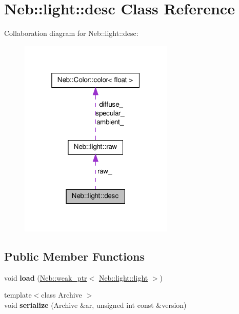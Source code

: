 \hypertarget{classNeb_1_1light_1_1desc}{\section{\-Neb\-:\-:light\-:\-:desc \-Class \-Reference}
\label{classNeb_1_1light_1_1desc}
}


\-Collaboration diagram for \-Neb\-:\-:light\-:\-:desc\-:\nopagebreak
\begin{figure}[H]
\begin{center}
\leavevmode
\includegraphics[width=208pt]{classNeb_1_1light_1_1desc__coll__graph}
\end{center}
\end{figure}
\subsection*{\-Public \-Member \-Functions}
\begin{DoxyCompactItemize}
\item 
\hypertarget{classNeb_1_1light_1_1desc_ae7538bcea26fa1e05cd146845ce6059c}{void {\bfseries load} (\hyperlink{classNeb_1_1weak__ptr}{\-Neb\-::weak\-\_\-ptr}$<$ \hyperlink{classNeb_1_1light_1_1light}{\-Neb\-::light\-::light} $>$)}\label{classNeb_1_1light_1_1desc_ae7538bcea26fa1e05cd146845ce6059c}

\item 
\hypertarget{classNeb_1_1light_1_1desc_a4fd70a911dc2b14714989c928103cc4f}{{\footnotesize template$<$class Archive $>$ }\\void {\bfseries serialize} (\-Archive \&ar, unsigned int const \&version)}\label{classNeb_1_1light_1_1desc_a4fd70a911dc2b14714989c928103cc4f}

\end{DoxyCompactItemize}
